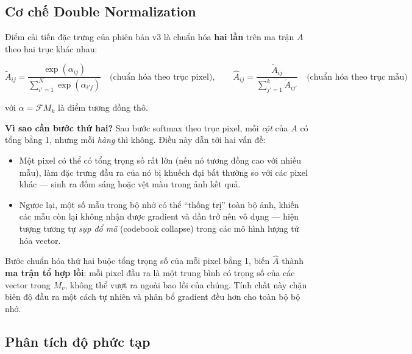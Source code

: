 \subsection{Cơ chế Double Normalization}
\label{subsec:double_norm}

Điểm cải tiến đặc trưng của phiên bản v3 là chuẩn hóa \textbf{hai lần} trên ma trận $A$ theo hai trục khác nhau:

\begin{equation}
\label{eq:double_norm}
\widetilde{A}_{ij} = \frac{\exp(\alpha_{ij})}{\sum_{i'=1}^{N} \exp(\alpha_{i'j})} \quad \text{(chuẩn hóa theo trục pixel)}, \qquad
\widehat{A}_{ij} = \frac{\widetilde{A}_{ij}}{\sum_{j'=1}^{k} \widetilde{A}_{ij'}} \quad \text{(chuẩn hóa theo trục mẫu)}
\end{equation}

\noindent với $\alpha = \mathcal{F} M_k$ là điểm tương đồng thô.

\textbf{Vì sao cần bước thứ hai?} Sau bước softmax theo trục pixel, mỗi \textit{cột} của $A$ có tổng bằng 1, nhưng mỗi \textit{hàng} thì không. Điều này dẫn tới hai vấn đề:

\begin{itemize}
    \item Một pixel có thể có tổng trọng số rất lớn (nếu nó tương đồng cao với nhiều mẫu), làm đặc trưng đầu ra của nó bị khuếch đại bất thường so với các pixel khác --- sinh ra đốm sáng hoặc vệt màu trong ảnh kết quả.
    \item Ngược lại, một số mẫu trong bộ nhớ có thể ``thống trị'' toàn bộ ảnh, khiến các mẫu còn lại không nhận được gradient và dần trở nên vô dụng --- hiện tượng tương tự \textit{sụp đổ mã} (codebook collapse) trong các mô hình lượng tử hóa vector.
\end{itemize}

Bước chuẩn hóa thứ hai buộc tổng trọng số của mỗi pixel bằng 1, biến $\widehat{A}$ thành \textbf{ma trận tổ hợp lồi}: mỗi pixel đầu ra là một trung bình có trọng số của các vector trong $M_v$, không thể vượt ra ngoài bao lồi của chúng. Tính chất này chặn biên độ đầu ra một cách tự nhiên và phân bổ gradient đều hơn cho toàn bộ bộ nhớ.

\subsection{Phân tích độ phức tạp}
\label{subsec:ea_complexity}

